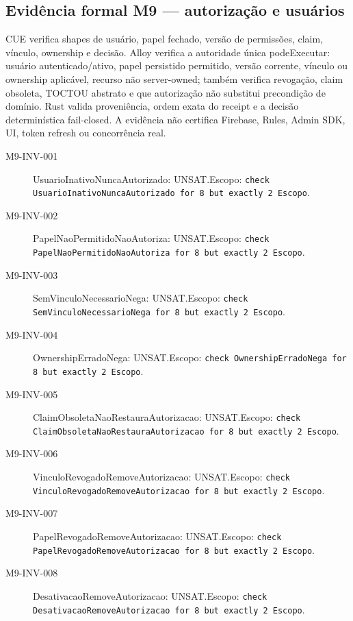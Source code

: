 \subsection*{Evidência formal M9 --- autorização e usuários}
CUE verifica shapes de usuário, papel fechado, versão de permissões, claim, vínculo, ownership e decisão. Alloy verifica a autoridade única podeExecutar: usuário autenticado/ativo, papel persistido permitido, versão corrente, vínculo ou ownership aplicável, recurso não server-owned; também verifica revogação, claim obsoleta, TOCTOU abstrato e que autorização não substitui precondição de domínio. Rust valida proveniência, ordem exata do receipt e a decisão determinística fail-closed. A evidência não certifica Firebase, Rules, Admin SDK, UI, token refresh ou concorrência real.
\begin{description}
\item[M9-INV-001] UsuarioInativoNuncaAutorizado: UNSAT.\newline Escopo: \texttt{check UsuarioInativoNuncaAutorizado for 8 but exactly 2 Escopo}.
\item[M9-INV-002] PapelNaoPermitidoNaoAutoriza: UNSAT.\newline Escopo: \texttt{check PapelNaoPermitidoNaoAutoriza for 8 but exactly 2 Escopo}.
\item[M9-INV-003] SemVinculoNecessarioNega: UNSAT.\newline Escopo: \texttt{check SemVinculoNecessarioNega for 8 but exactly 2 Escopo}.
\item[M9-INV-004] OwnershipErradoNega: UNSAT.\newline Escopo: \texttt{check OwnershipErradoNega for 8 but exactly 2 Escopo}.
\item[M9-INV-005] ClaimObsoletaNaoRestauraAutorizacao: UNSAT.\newline Escopo: \texttt{check ClaimObsoletaNaoRestauraAutorizacao for 8 but exactly 2 Escopo}.
\item[M9-INV-006] VinculoRevogadoRemoveAutorizacao: UNSAT.\newline Escopo: \texttt{check VinculoRevogadoRemoveAutorizacao for 8 but exactly 2 Escopo}.
\item[M9-INV-007] PapelRevogadoRemoveAutorizacao: UNSAT.\newline Escopo: \texttt{check PapelRevogadoRemoveAutorizacao for 8 but exactly 2 Escopo}.
\item[M9-INV-008] DesativacaoRemoveAutorizacao: UNSAT.\newline Escopo: \texttt{check DesativacaoRemoveAutorizacao for 8 but exactly 2 Escopo}.

\end{description}
